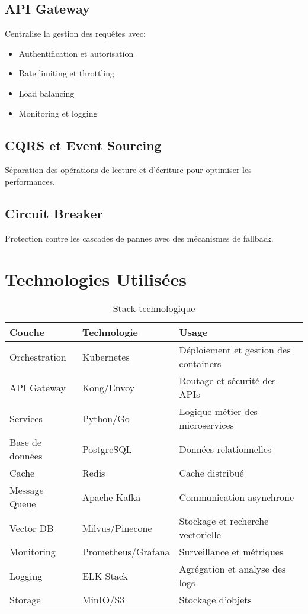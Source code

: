 \documentclass[12pt,a4paper]{article}
\begin{document}
\subsection{API Gateway}
Centralise la gestion des requêtes avec:
\begin{itemize}
    \item Authentification et autorisation
    \item Rate limiting et throttling
    \item Load balancing
    \item Monitoring et logging
\end{itemize}

\subsection{CQRS et Event Sourcing}
Séparation des opérations de lecture et d'écriture pour optimiser les performances.

\subsection{Circuit Breaker}
Protection contre les cascades de pannes avec des mécanismes de fallback.

\section{Technologies Utilisées}

\begin{table}[H]
\centering
\begin{tabular}{|l|l|l|}
\hline
\textbf{Couche} & \textbf{Technologie} & \textbf{Usage} \\
\hline
Orchestration & Kubernetes & Déploiement et gestion des containers \\
\hline
API Gateway & Kong/Envoy & Routage et sécurité des APIs \\
\hline
Services & Python/Go & Logique métier des microservices \\
\hline
Base de données & PostgreSQL & Données relationnelles \\
\hline
Cache & Redis & Cache distribué \\
\hline
Message Queue & Apache Kafka & Communication asynchrone \\
\hline
Vector DB & Milvus/Pinecone & Stockage et recherche vectorielle \\
\hline
Monitoring & Prometheus/Grafana & Surveillance et métriques \\
\hline
Logging & ELK Stack & Agrégation et analyse des logs \\
\hline
Storage & MinIO/S3 & Stockage d'objets \\
\hline
\end{tabular}
\caption{Stack technologique}
\end{table}
\end{document}
